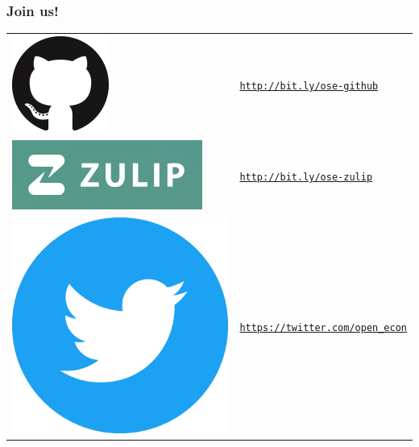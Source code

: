 \begin{frame}\frametitle{Join us!}\vspace{1.25cm}

\vspace{-0.75cm}

\begin{table}[]
	\begin{tabularx}{1\textwidth}{>{\centering\arraybackslash}m{1.5cm} >{\arraybackslash}m{5cm}}
		\href{http://bit.ly/ose-github}{\includegraphics[scale=0.15]{material/crop-github-mark.png}} &
		\href{http://bit.ly/ose-github}{\texttt{http://bit.ly/ose-github}} \\[1cm]

		\href{http://bit.ly/ose-zulip}{\includegraphics[scale=0.35]{material/crop-zulip-mark.png}} &
		\href{http://bit.ly/ose-zulip}{\texttt{http://bit.ly/ose-zulip}}    \\[0.8cm]

		\href{https://twitter.com/open_econ}{\includegraphics[scale=0.05]{material/crop-twitter-mark.png}} &
		\href{https://twitter.com/open_econ}{\texttt{https://twitter.com/open\_econ}} \\[0.8cm]


\end{tabularx}
\end{table}
\end{frame}
